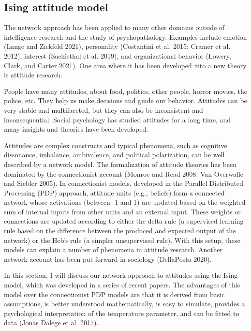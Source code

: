 \documentclass[
  letterpaper,
]{scrbook}
\begin{document}
\hypertarget{ising-attitude-model}{%
\subsection{Ising attitude model}\label{ising-attitude-model}}

The network approach has been applied to many other domains outside of
intelligence research and the study of psychopathology. Examples include
emotion (Lange and Zickfeld 2021), personality (Costantini et al. 2015;
Cramer et al. 2012), interest (Sachisthal et al. 2019), and
organizational behavior (Lowery, Clark, and Carter 2021). One area where
it has been developed into a new theory is attitude research.

People have many attitudes, about food, politics, other people, horror
movies, the police, etc. They help us make decisions and guide our
behavior. Attitudes can be very stable and multifaceted, but they can
also be inconsistent and inconsequential. Social psychology has studied
attitudes for a long time, and many insights and theories have been
developed.

Attitudes are complex constructs and typical phenomena, such as
cognitive dissonance, imbalance, ambivalence, and political
polarization, can be well described by a network model. The
formalization of attitude theories has been dominated by the
connectionist account (Monroe and Read 2008; Van Overwalle and Siebler
2005). In connectionist models, developed in the Parallel Distributed
Processing (PDP) approach, attitude units (e.g., beliefs) form a
connected network whose activations (between -1 and 1) are updated based
on the weighted sum of internal inputs from other units and an external
input. These weights or connections are updated according to either the
delta rule (a supervised learning rule based on the difference between
the produced and expected output of the network) or the Hebb rule (a
simpler unsupervised rule). With this setup, these models can explain a
number of phenomena in attitude research. Another network account has
been put forward in sociology (DellaPosta 2020).

In this section, I will discuss our network approach to attitudes using
the Ising model, which was developed in a series of recent papers. The
advantages of this model over the connectionist PDP models are that it
is derived from basic assumptions, is better understood mathematically,
is easy to simulate, provides a psychological interpretation of the
temperature parameter, and can be fitted to data (Jonas Dalege et al.
2017).
\end{document}
